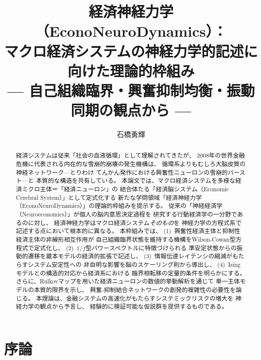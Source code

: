 \documentclass[12pt,twocolumn]{ltjsarticle}
\begin{document}
\title{
  \textbf{経済神経力学（EconoNeuroDynamics）：}\\[4pt]
  \textbf{マクロ経済システムの神経力学的記述に向けた理論的枠組み}\\[8pt]
  {\normalsize --- 自己組織臨界・興奮抑制均衡・振動同期の観点から ---}
}

\author{
  石橋勇輝
}

\date{}

\maketitle

\begin{abstract}
\noindent
経済システムは従来「社会の血液循環」として理解されてきたが、
2008年の世界金融危機に代表される内在的な雪崩的崩壊の発生機構は、
循環系よりもむしろ大脳皮質の神経ネットワーク---とりわけ
てんかん発作における興奮性ニューロンの雪崩的バースト---と
本質的な構造を共有している。
本論文では、マクロ経済システムを多様な経済ミクロ主体＝「経済ニューロン」の
結合体たる「経済脳システム（Economic Cerebral System）」として定式化する
新たな学問領域「経済神経力学（EconoNeuroDynamics）」の理論的枠組みを提示する。
従来の「神経経済学（Neuroeconomics）」が個人の脳内意思決定過程を
研究する行動経済学の一分野であるのに対し、
経済神経力学はマクロ経済システム\emph{そのもの}を
神経力学の方程式系で記述する点において根本的に異なる。
本枠組みでは、
(1)~興奮性経済主体と抑制性経済主体の非線形相互作用が
自己組織臨界状態を維持する機構をWilson-Cowan型方程式で定式化し、
(2)~$1/f$型パワースペクトルに特徴づけられる
準安定状態からの振動的遷移を蔵本モデルの経済的拡張で記述し、
(3)~情報伝達レイテンシの縮減がもたらすシステム安定性への
非自明な影響を脳のスケーリング則から導出し、
(4)~Isingモデルとの構造的対応から経済系における
臨界相転移の定量的条件を明らかにする。
さらに、Rulkovマップを用いた経済ニューロンの数値的挙動解析を通じて
単一主体モデルの本質的限界を示し、
興奮-抑制結合ネットワークの創発的複雑性の必要性を論じる。
本理論は、金融システムの高速化がもたらすシステミックリスクの増大を
神経力学の観点から予言し、
経験的に検証可能な仮説群を提供するものである。
\end{abstract}

\section{序論}
\end{document}
